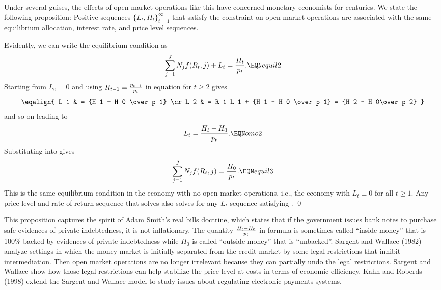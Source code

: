  Under several guises, the effects of open market operations
like this have concerned monetary economists for centuries.
We  state the following proposition:
\medskip
{}   
Positive sequences $\{L_t, H_t\}_{t=1}^\infty$
 that satisfy the constraint
 on open market operations  are associated with the same equilibrium allocation,
interest rate, and price level sequences.

\medskip
{}
Evidently, we can write the equilibrium condition  as
$$ \sum_{j=1}^J N_j f(R_t, j) + L_t = {H_{t}\over p_t}. \EQN equil2 $$
Starting from $L_0 = 0$ and using $R_{t-1} = {p_{t-1} \over p_t}$
in equation  
for $t \geq 2$ gives
$$\eqalign{ L_1 & = {H_1 - H_0 \over p_1} \cr 
            L_2 & = R_1 L_1 + {H_1 - H_0 \over p_1} = {H_2 - H_0\over p_2} }$$
%         
and so on leading to
$$ L_t = {H_t - H_0\over p_t }. \EQN omo2 $$
Substituting  into  gives
$$ \sum_{j=1}^J N_j f(R_t, j)  = {H_{0}\over p_t}. \EQN equil3 $$
This is the same equilibrium condition in the economy with
no open market operations, i.e., the economy
with $L_t \equiv 0$ for all $t\geq 1$.   Any price level  and rate of
return sequence that solves  also solves  for
any $L_t$ sequence satisfying . \qed

\medskip
This proposition captures  the spirit of Adam Smith's
real bills doctrine, which states that if the
government issues bank notes to purchase safe evidences
of private indebtedness, it is not inflationary. The quantity
$ {H_t - H_0\over p_t }$ in formula  is sometimes called ``inside money'' 
that is 100\% backed by evidences of private indebtedness while
$H_0$ is called ``outside money'' that is ``unbacked''.   
Sargent and Wallace (1982) analyze
settings in which the money market is initially separated from
the credit market by some legal restrictions that inhibit
intermediation.  Then open market operations are no longer
irrelevant because they can  partially  undo the
legal restrictions.  Sargent and Wallace show how those
legal restrictions can help stabilize the
price level at  costs in terms of economic efficiency.
Kahn and Roberds (1998) extend the Sargent and Wallace model  to study
 issues about regulating electronic payments systems.
